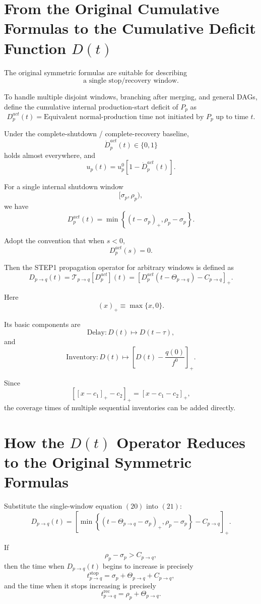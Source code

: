 \documentclass[11pt]{article}
\begin{document}
\section{From the Original Cumulative Formulas to the Cumulative Deficit Function \(D(t)\)}

The original symmetric formulas are suitable for describing
\[
\boxed{\text{a single stop/recovery window}.}
\]

To handle multiple disjoint windows, branching after merging, and general DAGs,
define the cumulative internal production-start deficit of \(P_p\) as
\[
\boxed{
D_p^{act}(t)
=
\text{Equivalent normal-production time not initiated by \(P_p\) up to time \(t\)}.
}
\tag{18}
\]

Under the complete-shutdown / complete-recovery baseline,
\[
\dot D_p^{act}(t)\in\{0,1\}
\]
holds almost everywhere, and
\[
\boxed{
u_p(t)
=
u_p^0\left[1-\dot D_p^{act}(t)\right].
}
\tag{19}
\]

For a single internal shutdown window
\[
[\sigma_p,\rho_p),
\]
we have
\[
\boxed{
D_p^{act}(t)
=
\min\left\{
(t-\sigma_p)_+,
\rho_p-\sigma_p
\right\}.
}
\tag{20}
\]

Adopt the convention that when \(s<0\),
\[
D_p^{act}(s)=0.
\]

Then the STEP1 propagation operator for arbitrary windows is defined as
\[
\boxed{
D_{p\to q}(t)
=
\mathcal T_{p\to q}[D_p^{act}](t)
=
\left[
D_p^{act}(t-\Theta_{p\to q})
-
C_{p\to q}
\right]_+.
}
\tag{21}
\]

Here
\[
(x)_+\equiv\max\{x,0\}.
\]

Its basic components are
\[
\boxed{
\text{Delay}:D(t)\mapsto D(t-\tau),
}
\tag{22}
\]
and
\[
\boxed{
\text{Inventory}:D(t)\mapsto
\left[D(t)-\frac{q(0)}{f^0}\right]_+.
}
\tag{23}
\]

Since
\[
[[x-c_1]_+-c_2]_+
=
[x-c_1-c_2]_+,
\]
the coverage times of multiple sequential inventories can be added directly.

\section{How the \(D(t)\) Operator Reduces to the Original Symmetric Formulas}

Substitute the single-window equation \((20)\) into \((21)\):
\[
D_{p\to q}(t)
=
\left[
\min\left\{
(t-\Theta_{p\to q}-\sigma_p)_+,
\rho_p-\sigma_p
\right\}
-
C_{p\to q}
\right]_+.
\tag{24}
\]

If
\[
\rho_p-\sigma_p>C_{p\to q},
\]
then the time when \(D_{p\to q}(t)\) begins to increase is precisely
\[
\boxed{
t_{p\to q}^{\mathrm{stop}}
=
\sigma_p+\Theta_{p\to q}+C_{p\to q},
}
\]
and the time when it stops increasing is precisely
\[
\boxed{
t_{p\to q}^{\mathrm{rec}}
=
\rho_p+\Theta_{p\to q}.
}
\]
\end{document}
